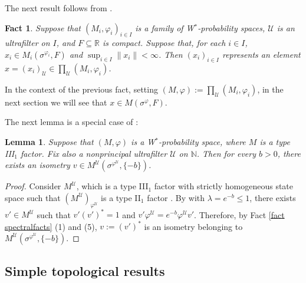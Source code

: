 \documentclass[12pt]{amsart}
\newtheorem{lem}[thm]{Lemma}
\newtheorem{fact}[thm]{Fact}
\theoremstyle{definition}
\def\bb{\mathbb}
\def\bb{\mathbb}
\def\cal{\mathcal}
\def\u{\mathsf 1}
\newcommand\cU{{\cal U}}
\def \u{\mathcal U}
\begin{document}
The next result follows from \cite[Lemma 4.13]{AH14}. 
\begin{fact}\label{fact spectralultrafact}
Suppose that $(M_i,\varphi_i)_{i\in I}$ is a family of W$^*$-probability spaces, $\u$ is an ultrafilter on $I$, and $F\subseteq \mathbb{R}$ is compact.  Suppose that, for each $i\in I$, $x_i\in M_i(\sigma^{\varphi_i},F)$ and $\sup_{i\in I}\|x_i\|<\infty$.  Then $(x_i)_{i\in I}$ represents an element $x=(x_i)_\u\in \prod_\u (M_i,\varphi_i)$.
\end{fact}

In the context of the previous fact, setting $(M,\varphi):=\prod_\u (M_i,\varphi_i)$, in the next section we will see that $x\in M(\sigma^\varphi,F)$.

The next lemma is a special case of \cite[Lemma 3.4]{AHHM20}:
\begin{lem}\label{lem isometry}
   Suppose that $(M,\varphi)$ is a W$^*$-probability space, where $M$ is a type III$_1$ factor.  Fix also a nonprincipal ultrafilter $\u$ on $\bb N$.  Then for every $b > 0$, there exists an isometry $v \in M^\mathcal{U}(\sigma^{\varphi^\mathcal{U}}, \{-b\})$.
\end{lem}
\begin{proof}
Consider $M^{\cU}$, which is a type III$_1$ factor with strictly homogeneous state space such that $(M^{\cU})_{\varphi^{\cU}}$ is a type II$_1$ factor \cite[Theorem 4.20 and Lemma 4.23]{AH14}. By \cite[Lemma 3.4]{AHHM20} with $\lambda=e^{-b}\le 1$, there exists $v'\in M^{\cU}$ such that $v'(v')^*=1$ and $v'\varphi^{\cU}=e^{-b}\varphi^{\cU}v'$. Therefore, by Fact \ref{fact spectralfacts} (1) and (5), $v:=(v')^*$ is an isometry belonging to $M^{\cU}(\sigma^{\varphi^{\cU}},\{-b\})$. 
\end{proof}

\subsection{Simple topological results}
\end{document}
